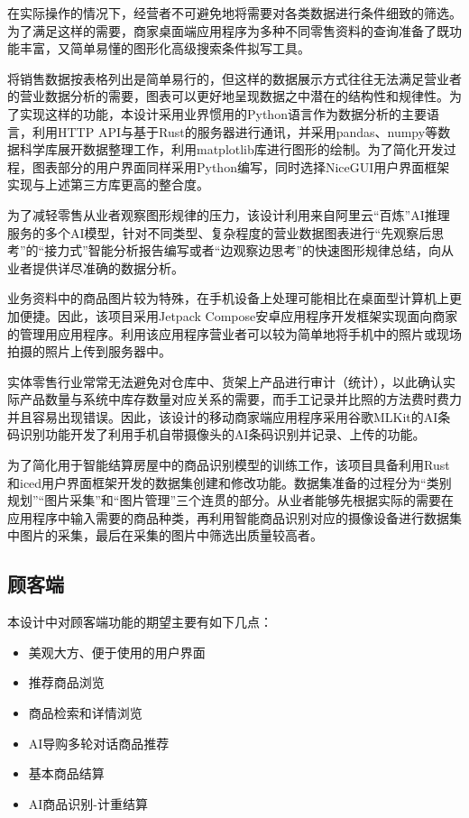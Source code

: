 在实际操作的情况下，经营者不可避免地将需要对各类数据进行条件细致的筛选。为了满足这样的需要，商家桌面端应用程序为多种不同零售资料的查询准备了既功能丰富，又简单易懂的图形化高级搜索条件拟写工具。

将销售数据按表格列出是简单易行的，但这样的数据展示方式往往无法满足营业者的营业数据分析的需要，图表可以更好地呈现数据之中潜在的结构性和规律性。为了实现这样的功能，本设计采用业界惯用的Python语言作为数据分析的主要语言，利用HTTP API与基于Rust的服务器进行通讯，并采用pandas、numpy等数据科学库展开数据整理工作，利用matplotlib库进行图形的绘制。为了简化开发过程，图表部分的用户界面同样采用Python编写，同时选择NiceGUI用户界面框架实现与上述第三方库更高的整合度。

为了减轻零售从业者观察图形规律的压力，该设计利用来自阿里云“百炼”AI推理服务的多个AI模型，针对不同类型、复杂程度的营业数据图表进行“先观察后思考”的“接力式”智能分析报告编写或者“边观察边思考”的快速图形规律总结，向从业者提供详尽准确的数据分析。

业务资料中的商品图片较为特殊，在手机设备上处理可能相比在桌面型计算机上更加便捷。因此，该项目采用Jetpack Compose安卓应用程序开发框架实现面向商家的管理用应用程序。利用该应用程序营业者可以较为简单地将手机中的照片或现场拍摄的照片上传到服务器中。

实体零售行业常常无法避免对仓库中、货架上产品进行审计（统计），以此确认实际产品数量与系统中库存数量对应关系的需要，而手工记录并比照的方法费时费力并且容易出现错误。因此，该设计的移动商家端应用程序采用谷歌MLKit的AI条码识别功能开发了利用手机自带摄像头的AI条码识别并记录、上传的功能。

为了简化用于智能结算房屋中的商品识别模型的训练工作，该项目具备利用Rust和iced用户界面框架开发的数据集创建和修改功能。数据集准备的过程分为“类别规划”“图片采集”和“图片管理”三个连贯的部分。从业者能够先根据实际的需要在应用程序中输入需要的商品种类，再利用智能商品识别对应的摄像设备进行数据集中图片的采集，最后在采集的图片中筛选出质量较高者。

\subsection{顾客端}

本设计中对顾客端功能的期望主要有如下几点：

\begin{itemize}
    \item 美观大方、便于使用的用户界面
    \item 推荐商品浏览
    \item 商品检索和详情浏览
    \item AI导购多轮对话商品推荐
    \item 基本商品结算
    \item AI商品识别-计重结算
\end{itemize}

